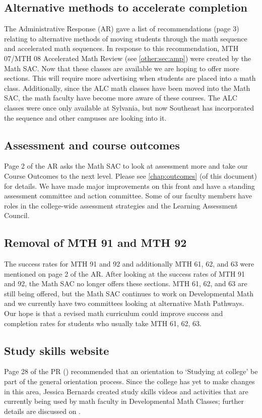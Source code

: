 \subsection{Alternative methods to accelerate completion}
The Administrative Response (AR) gave a list of recommendations (page 3) relating to alternative methods
of moving students through the math sequence and accelerated math sequences.  In
response to this recommendation, MTH 07/MTH 08 Accelerated Math Review (see
\vref{other:sec:amp}) were created by the Math SAC.
Now that these classes are available we are hoping to offer more sections.  This
will require more advertising when students are placed into a math class.
Additionally, since the ALC math classes have been moved into the Math SAC, the math
faculty have become more aware of these courses.  The ALC classes were once only
available at Sylvania, but now Southeast has incorporated the sequence
and other campuses are looking into it.

\subsection{Assessment and course outcomes}
Page 2 of the AR asks the Math SAC to look at assessment more and take our
Course Outcomes to the next level.  Please see \vref{chap:outcomes} (of this
document) for
details.  We have made major improvements on this front and have a standing
assessment committee and action committee.  Some of our faculty members have
roles in the college-wide assessment strategies and the Learning Assessment Council.

\subsection{Removal of MTH 91 and MTH 92}
The success rates for MTH 91 and 92 and additionally MTH 61, 62, and 63 were
mentioned on page 2 of the AR.  After looking at the success rates of MTH 91 and
92, the Math SAC no longer offers these sections.   MTH 61, 62, and 63 are still
being offered, but the Math SAC continues to work on Developmental Math and we
currently have two committees looking at alternative Math Pathways.
Our hope is that a revised math curriculum could improve success and completion
rates for students who usually take MTH 61, 62, 63.

\subsection{Study skills website}
Page 28 of the PR (\cite{mathprogramreview2003}) recommended that an orientation to `Studying at college'
be part of the general orientation process.  Since the college has yet to make
changes in this area, Jessica Bernards created study skills videos and activities
that are currently being used by math faculty in Developmental Math Classes;
further details are discussed on .


